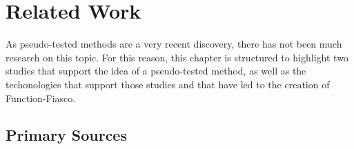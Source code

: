 %
%
\chapter{Related Work}\label{ch:relatedwork}


As pseudo-tested methods are a very recent discovery, there has not been much research on this topic. For this reason, this chapter is structured to highlight two studies that support the idea of a pseudo-tested method, as well as the techonologies that support those studies and that have led to the creation of Function-Fiasco.

\section{Primary Sources}

